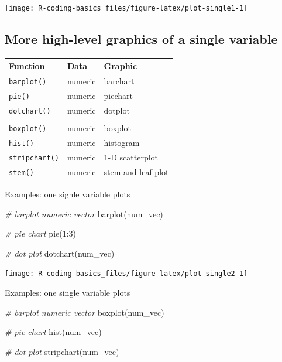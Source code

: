 \documentclass[
]{book}
\newenvironment{Shaded}{\begin{snugshade}}{\end{snugshade}}
\newcommand{\CommentTok}[1]{\textcolor[rgb]{0.56,0.35,0.01}{\textit{#1}}}
\newcommand{\DecValTok}[1]{\textcolor[rgb]{0.00,0.00,0.81}{#1}}
\newcommand{\FunctionTok}[1]{\textcolor[rgb]{0.00,0.00,0.00}{#1}}
\newcommand{\NormalTok}[1]{#1}
\newcommand{\SpecialCharTok}[1]{\textcolor[rgb]{0.00,0.00,0.00}{#1}}
\begin{document}
\begin{center}\texttt{[image: R-coding-basics\_files/figure-latex/plot-single1-1]} \end{center}

\hypertarget{more-high-level-graphics-of-a-single-variable}{%
\subsection{More high-level graphics of a single variable}\label{more-high-level-graphics-of-a-single-variable}}

\begin{longtable}[]{@{}lll@{}}
\toprule()
Function & Data & Graphic \\
\midrule()
\endhead
\texttt{barplot()} & numeric & barchart \\
\texttt{pie()} & numeric & piechart \\
\texttt{dotchart()} & numeric & dotplot \\
& & \\
\texttt{boxplot()} & numeric & boxplot \\
\texttt{hist()} & numeric & histogram \\
\texttt{stripchart()} & numeric & 1-D scatterplot \\
\texttt{stem()} & numeric & stem-and-leaf plot \\
\bottomrule()
\end{longtable}

Examples: one signle variable plots

\begin{Shaded}
\begin{Highlighting}[]
\CommentTok{\# barplot numeric vector}
\FunctionTok{barplot}\NormalTok{(num\_vec)}

\CommentTok{\# pie chart}
\FunctionTok{pie}\NormalTok{(}\DecValTok{1}\SpecialCharTok{:}\DecValTok{3}\NormalTok{)}

\CommentTok{\# dot plot}
\FunctionTok{dotchart}\NormalTok{(num\_vec)}
\end{Highlighting}
\end{Shaded}

\begin{center}\texttt{[image: R-coding-basics\_files/figure-latex/plot-single2-1]} \end{center}

Examples: one single variable plots

\begin{Shaded}
\begin{Highlighting}[]
\CommentTok{\# barplot numeric vector}
\FunctionTok{boxplot}\NormalTok{(num\_vec)}

\CommentTok{\# pie chart}
\FunctionTok{hist}\NormalTok{(num\_vec)}

\CommentTok{\# dot plot}
\FunctionTok{stripchart}\NormalTok{(num\_vec)}
\end{Highlighting}
\end{Shaded}
\end{document}
